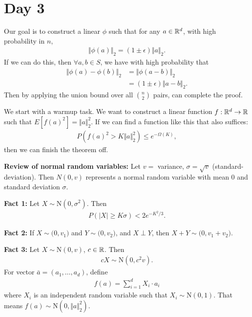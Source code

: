 \documentclass{report}
\begin{document}
\section{Day 3}
\noindent Our goal is to construct a linear $\phi$ such that for any $a \in \RR^d$, with high probability in $n$, 
\begin{align*}
    \Vert \phi (a) \Vert_2 = (1 \pm \epsilon) \Vert a \Vert_2. 
\end{align*}
If we can do this, then $\forall a, b \in S$, we have with high probability that
\begin{align*}
    \Vert \phi(a) - \phi(b) \Vert_2  &= \Vert \phi(a-b)\Vert_2 \\
    &= (1 \pm \epsilon) \Vert a- b \Vert_2.
\end{align*}
Then by applying the union bound over all $\binom n2$ pairs,  can complete the proof. 

\noindent We start with a warmup task. We want to construct a linear function $f: \RR^d \to \RR$ such that $E[f(a)^2] = \Vert a \Vert_2^2$. If we can find a function like this that also suffices:
\begin{align*}
    P(f(a)^2 > K\Vert a \Vert_2^2) \leq e^{-\Omega(K)},
\end{align*}
then we can finish the theorem off. 

\noindent \textbf{Review of normal random variables:} Let $v = $ variance, $\sigma  = \sqrt v$ (standard-deviation). Then $N(0, v)$ represents a normal random variable with mean 0 and standard deviation $\sigma$. 

\noindent \textbf{Fact 1:} Let $X \sim \mathrm N(0, \sigma^2)$. Then
\begin{align*}
    P(|X| \geq K \sigma) < 2e^{-K^2/3}.
\end{align*}

\noindent \textbf{Fact 2:} If $X \sim \mathrm(0, v_1)$ and $Y \sim \mathrm(0, v_2)$, and $X \perp Y$, then $X + Y \sim \mathrm(0, v_1 + v_2)$. 

\noindent \textbf{Fact 3:} Let $X \sim \mathrm N(0, v)$, $c \in \RR$. Then
\begin{align*}
    cX \sim \mathrm N(0, c^2v).
\end{align*}
For vector $\bar a = (a_1, \ldots, a_d)$, define 
\begin{align*}
    f(a) = \sum_{i=1}^d X_i \cdot a_i
\end{align*}
where $X_i$ is an independent random variable such that $X_i \sim \mathrm N(0, 1)$. That means $f(a) \sim \mathrm N(0, \Vert a \Vert_2^2)$. 
\end{document}
